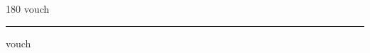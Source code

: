 
\begin{frame}
\begin{center}
\begin{turn}{180}
{\fontsize{2.5cm}{1em}\selectfont vouch}
\end{turn}
\vspace{1em}\par  
\hrule
\vspace{1em}\par  
{\fontsize{2.5cm}{1em}\selectfont vouch}
\end{center}
\end{frame}
